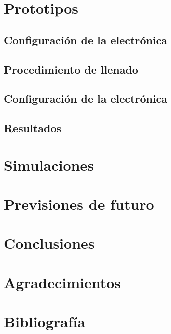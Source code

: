 \documentclass[11pt,a4paper]{article}
\begin{document}
\newpage
\section{Prototipos} \label{sec:ch04}

	\subsection{Configuración de la electrónica}
	
	
	\subsection{Procedimiento de llenado}
	
	
	\subsection{Configuración de la electrónica}
	
	
	\subsection{Resultados}
	

\newpage
\section{Simulaciones} \label{sec:ch04}


\newpage
\section{Previsiones de futuro} \label{sec:ch04}


\newpage
\section{Conclusiones} \label{sec:conclusions}


\section{Agradecimientos} \label{sec:conclusions}


\section{Bibliografía} \label{sec:bibliographia}

\end{document}
